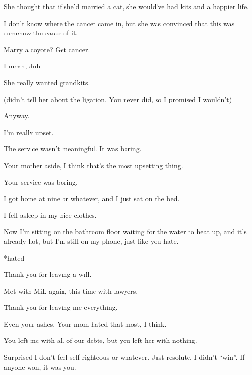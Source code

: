 { She thought that if she'd married a cat, she would've had kits and a happier life.

 I don't know where the cancer came in, but she was convinced that this was somehow the cause of it.

 Marry a coyote? Get cancer.

 I mean, duh.

 She really wanted grandkits.

(didn't tell her about the ligation. You never did, so I promised I wouldn't)

 Anyway.

 I'm really upset.

 The service wasn't meaningful. It was boring.

 Your mother aside, I think that's the most upsetting thing.

 Your service was boring.

 I got home at nine or whatever, and I just sat on the bed.

 I fell asleep in my nice clothes.

 Now I'm sitting on the bathroom floor waiting for the water to heat up, and it's already hot, but I'm still on my phone, just like you hate.

*hated

\newpage

\nopagebreak

 Thank you for leaving a will.

 Met with MiL again, this time with lawyers.

 Thank you for leaving me everything.

 Even your ashes. Your mom hated that most, I think.

 You left me with all of our debts, but you left her with nothing.

 Surprised I don't feel self-righteous or whatever. Just resolute. I didn't ``win''. If anyone won, it was you.

}
